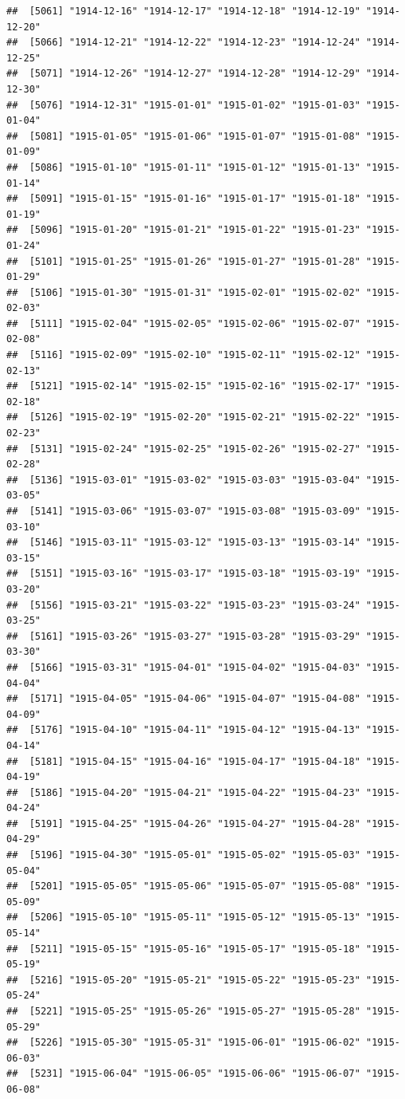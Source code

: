 \documentclass{article}\usepackage[]{graphicx}\usepackage[]{color}
\makeatletter
\newenvironment{kframe}{%
 \def\at@end@of@kframe{}%
 \ifinner\ifhmode%
  \def\at@end@of@kframe{\end{minipage}}%
  \begin{minipage}{\columnwidth}%
 \fi\fi%
 \def\FrameCommand##1{\hskip\@totalleftmargin \hskip-\fboxsep
 \colorbox{shadecolor}{##1}\hskip-\fboxsep
     \hskip-\linewidth \hskip-\@totalleftmargin \hskip\columnwidth}%
 \MakeFramed {\advance\hsize-\width
   \@totalleftmargin\z@ \linewidth\hsize
   \@setminipage}}%
 {\par\unskip\endMakeFramed%
 \at@end@of@kframe}
\newenvironment{knitrout}{}{} %
\makeatother
\begin{document}
\begin{description}
\begin{knitrout}
\begin{kframe}
\begin{verbatim}
##  [5061] "1914-12-16" "1914-12-17" "1914-12-18" "1914-12-19" "1914-12-20"
##  [5066] "1914-12-21" "1914-12-22" "1914-12-23" "1914-12-24" "1914-12-25"
##  [5071] "1914-12-26" "1914-12-27" "1914-12-28" "1914-12-29" "1914-12-30"
##  [5076] "1914-12-31" "1915-01-01" "1915-01-02" "1915-01-03" "1915-01-04"
##  [5081] "1915-01-05" "1915-01-06" "1915-01-07" "1915-01-08" "1915-01-09"
##  [5086] "1915-01-10" "1915-01-11" "1915-01-12" "1915-01-13" "1915-01-14"
##  [5091] "1915-01-15" "1915-01-16" "1915-01-17" "1915-01-18" "1915-01-19"
##  [5096] "1915-01-20" "1915-01-21" "1915-01-22" "1915-01-23" "1915-01-24"
##  [5101] "1915-01-25" "1915-01-26" "1915-01-27" "1915-01-28" "1915-01-29"
##  [5106] "1915-01-30" "1915-01-31" "1915-02-01" "1915-02-02" "1915-02-03"
##  [5111] "1915-02-04" "1915-02-05" "1915-02-06" "1915-02-07" "1915-02-08"
##  [5116] "1915-02-09" "1915-02-10" "1915-02-11" "1915-02-12" "1915-02-13"
##  [5121] "1915-02-14" "1915-02-15" "1915-02-16" "1915-02-17" "1915-02-18"
##  [5126] "1915-02-19" "1915-02-20" "1915-02-21" "1915-02-22" "1915-02-23"
##  [5131] "1915-02-24" "1915-02-25" "1915-02-26" "1915-02-27" "1915-02-28"
##  [5136] "1915-03-01" "1915-03-02" "1915-03-03" "1915-03-04" "1915-03-05"
##  [5141] "1915-03-06" "1915-03-07" "1915-03-08" "1915-03-09" "1915-03-10"
##  [5146] "1915-03-11" "1915-03-12" "1915-03-13" "1915-03-14" "1915-03-15"
##  [5151] "1915-03-16" "1915-03-17" "1915-03-18" "1915-03-19" "1915-03-20"
##  [5156] "1915-03-21" "1915-03-22" "1915-03-23" "1915-03-24" "1915-03-25"
##  [5161] "1915-03-26" "1915-03-27" "1915-03-28" "1915-03-29" "1915-03-30"
##  [5166] "1915-03-31" "1915-04-01" "1915-04-02" "1915-04-03" "1915-04-04"
##  [5171] "1915-04-05" "1915-04-06" "1915-04-07" "1915-04-08" "1915-04-09"
##  [5176] "1915-04-10" "1915-04-11" "1915-04-12" "1915-04-13" "1915-04-14"
##  [5181] "1915-04-15" "1915-04-16" "1915-04-17" "1915-04-18" "1915-04-19"
##  [5186] "1915-04-20" "1915-04-21" "1915-04-22" "1915-04-23" "1915-04-24"
##  [5191] "1915-04-25" "1915-04-26" "1915-04-27" "1915-04-28" "1915-04-29"
##  [5196] "1915-04-30" "1915-05-01" "1915-05-02" "1915-05-03" "1915-05-04"
##  [5201] "1915-05-05" "1915-05-06" "1915-05-07" "1915-05-08" "1915-05-09"
##  [5206] "1915-05-10" "1915-05-11" "1915-05-12" "1915-05-13" "1915-05-14"
##  [5211] "1915-05-15" "1915-05-16" "1915-05-17" "1915-05-18" "1915-05-19"
##  [5216] "1915-05-20" "1915-05-21" "1915-05-22" "1915-05-23" "1915-05-24"
##  [5221] "1915-05-25" "1915-05-26" "1915-05-27" "1915-05-28" "1915-05-29"
##  [5226] "1915-05-30" "1915-05-31" "1915-06-01" "1915-06-02" "1915-06-03"
##  [5231] "1915-06-04" "1915-06-05" "1915-06-06" "1915-06-07" "1915-06-08"

\end{verbatim}
\end{kframe}
\end{knitrout}
\end{description}
\end{document}
